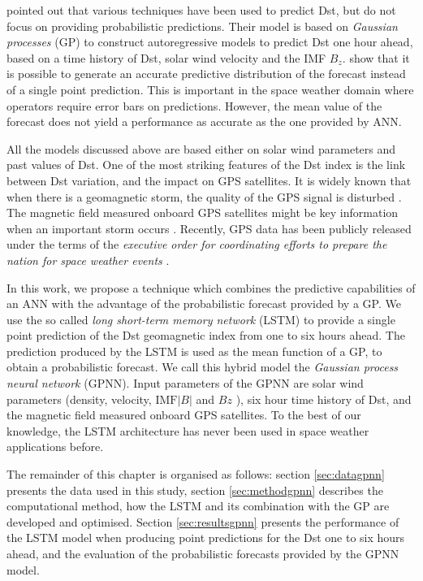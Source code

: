 \citet{ChandorkarDst} pointed out that various techniques have been used to predict Dst, but do not 
focus on providing probabilistic predictions. Their model is based on \emph{Gaussian processes} (GP) to construct 
autoregressive models to predict Dst one hour ahead, based on a time history of Dst, solar wind velocity and 
the IMF $B_z$. \citet{ChandorkarDst} show that it is possible to generate an accurate predictive distribution 
of the forecast instead of a single point prediction. This is important in the space weather domain where 
operators require error bars on predictions. However, the mean value of the forecast does not yield a 
performance as accurate as the one provided by ANN. 

All the models discussed above are based either on solar wind parameters and past values of Dst. One of the most 
striking features of the Dst index is the link between Dst variation, and the impact on GPS satellites. 
It is widely known that when there is a geomagnetic storm, the quality of the GPS signal is disturbed 
\citep{astafyeva2014geomagnetic}. The magnetic field measured onboard GPS satellites might be key information 
when an important storm occurs \citep{morley2017energetic}. Recently, GPS data has been publicly released under 
the terms of the \emph{executive order for coordinating efforts to prepare the nation for space weather events} 
\citep{obamasw}.

In this work, we propose a technique which combines the predictive capabilities of an ANN with the advantage of the 
probabilistic forecast provided by a GP. We use the so called \emph{long short-term memory network} (LSTM) 
\citep{hochreiter1997long} to provide a single point prediction of the Dst geomagnetic index from one to six 
hours ahead. The prediction produced by the LSTM is used as the mean function of a GP, to obtain a 
probabilistic forecast. We call this hybrid model the \emph{Gaussian process neural network} (GPNN). 
Input parameters of the GPNN are solar wind parameters (density, velocity,  
$\text{IMF}\vert B \vert$  and $Bz$ ), six hour time history of Dst, and the magnetic field 
measured onboard GPS satellites. To the best of our knowledge, the LSTM architecture has never 
been used in space weather applications before.

The remainder of this chapter is organised as follows: section \ref{sec:datagpnn} presents the data used in this study, 
section \ref{sec:methodgpnn} describes the computational method, how the LSTM and its combination with the GP are 
developed and optimised. Section \ref{sec:resultsgpnn} presents the performance of the LSTM model when producing 
point predictions for the Dst one to six hours ahead, and the evaluation of the probabilistic forecasts provided 
by the GPNN model. 

